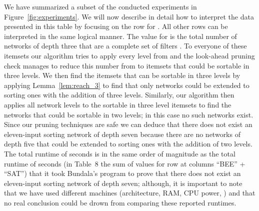 \documentclass[13pt,a4paper]{article}
\begin{document}
We have summarized a subset of the conducted experiments in Figure~\ref{fig:experiments}. We will now describe in detail how to interpret the data presented in this table by focusing on the row for . All other rows can be interpreted in the same logical manner. The value for  is the total number of networks of depth three that are a complete set of filters \cite{Marinov:SortingNetworks:ThirdLevel}. To everyone of these itemsets our algorithm tries to apply every level from  and the look-ahead pruning check manages to reduce this number from  to  itemsets that could be sortable in three levels. We then find the itemsets that can be sortable in three levels by applying Lemma~\ref{lem:reach_3} to find that only  networks could be extended to sorting ones with the addition of three levels. Similarly, our algorithm then applies all network levels to the sortable in three level itemsets to find the networks that could be sortable in two levels; in this case no such networks exist. Since our pruning techniques are safe we can deduce that there does not exist an eleven-input sorting network of depth seven because there are no networks of depth five that could be extended to sorting ones with the addition of two levels. The total runtime of  seconds is in the same order of magnitude as the total runtime of  seconds (in \cite{BundalaCCSZ14_Optimal_Depth} Table~8 the sum of values for row  at columns ``BEE'' + ``SAT'') that it took Bundala's program to prove that there does not exist an eleven-input sorting network of depth seven; although, it is important to note that we have used different machines (architecture, RAM, CPU power, ) and that no real conclusion could be drown from comparing these reported runtimes. 
\end{document}
